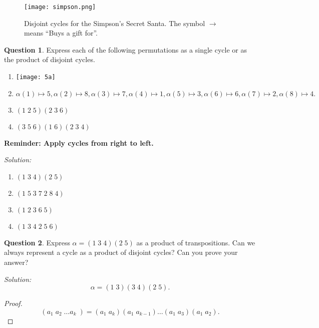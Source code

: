 \documentclass[a4paper,12pt]{article}
\theoremstyle{definition}
\newtheorem{question}{Question}%
\theoremstyle{remark}
\begin{document}


\begin{figure}[h]
  \centering
  \texttt{[image: simpson.png]}
\caption{\small{Disjoint cycles for the Simpson's Secret Santa. The symbol $\rightarrow$ means ``Buys a gift for''. }}
\end{figure}
\newpage
\begin{question}
  Express each of the following permutations as a single cycle or as the product of disjoint cycles.
  \begin{enumerate}
 \item \texttt{[image: 5a]}
   \item $\alpha(1) \mapsto 5, \alpha(2) \mapsto 8, \alpha(3) \mapsto 7, \alpha(4) \mapsto 1, \alpha(5) \mapsto 3, \alpha(6) \mapsto 6, \alpha(7) \mapsto 2, \alpha(8) \mapsto 4. $
      \item $(1\;2\;5)(2\;3\;6)$
        \item $(3\;5\;6)(1\;6)(2\;3\;4)$
  \end{enumerate}

\textbf{Reminder: Apply cycles from right to left.}

\end{question}

\textit{Solution:}

\begin{enumerate}
\item $ (1\;3\;4)(2\;5)$
\item $ (1 \; 5 \;3\;7\;2\;8\;4)$
\item $(1\;2\;3\;6\;5)$
\item $(1\;3\;4\;2\;5\;6)$
\end{enumerate}

\begin{question}
Express $\alpha = (1\;3\;4)(2\;5)$ as a product of transpositions. Can we always represent a cycle as a product of disjoint cycles? Can you prove your answer?
\end{question}

\textit{Solution:}
\begin{equation*}
  \alpha = (1\;3)(3\;4)(2\;5).
\end{equation*}
\begin{proof}
  \begin{equation*}
    (a_1\;a_2\; \hdots a_k\;) = (a_1\; a_k)(a_1\;a_{k-1})\hdots(a_1\;a_3)(a_1\;a_2).
  \end{equation*}
\end{proof}


 


\pagebreak
\end{document}
